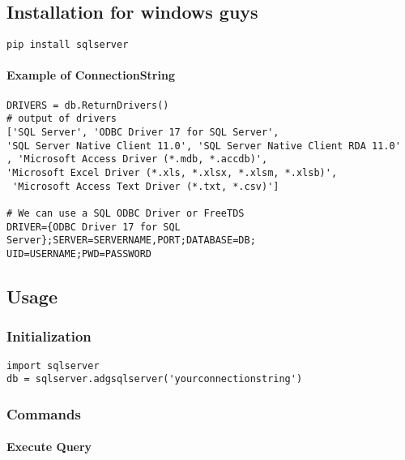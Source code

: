 \hypertarget{installation-for-windows-guys}{%
\subsection{Installation for windows
guys}\label{installation-for-windows-guys}}

\begin{verbatim}
pip install sqlserver
\end{verbatim}

\hypertarget{example-of-connectionstring}{%
\paragraph{Example of
ConnectionString}\label{example-of-connectionstring}}

\begin{verbatim}
DRIVERS = db.ReturnDrivers()
# output of drivers
['SQL Server', 'ODBC Driver 17 for SQL Server', 
'SQL Server Native Client 11.0', 'SQL Server Native Client RDA 11.0'
, 'Microsoft Access Driver (*.mdb, *.accdb)', 
'Microsoft Excel Driver (*.xls, *.xlsx, *.xlsm, *.xlsb)',
 'Microsoft Access Text Driver (*.txt, *.csv)']

# We can use a SQL ODBC Driver or FreeTDS
DRIVER={ODBC Driver 17 for SQL Server};SERVER=SERVERNAME,PORT;DATABASE=DB;
UID=USERNAME;PWD=PASSWORD
\end{verbatim}

\hypertarget{usage}{%
\subsection{Usage}\label{usage}}

\hypertarget{initialization}{%
\subsubsection{Initialization}\label{initialization}}

\begin{verbatim}
import sqlserver
db = sqlserver.adgsqlserver('yourconnectionstring')
\end{verbatim}

\hypertarget{commands}{%
\subsubsection{Commands}\label{commands}}

\hypertarget{execute-query}{%
\paragraph{Execute Query}\label{execute-query}}

